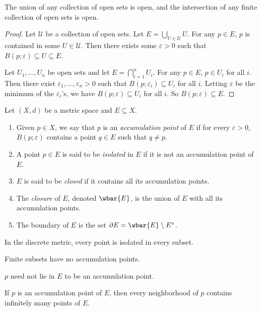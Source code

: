 \begin{proposition} \label{thm:open_union}
    The union of any collection of open sets is open, and the intersection
    of any finite collection of open sets is open.
\end{proposition}
\begin{proof}
    Let $\mathscr{U}$ be a collection of open sets.
    Let $E = \bigcup_{U \in \mathscr{U}} U$.
    For any $p \in E$, $p$ is contained in some $U \in \mathscr{U}$.
    Then there exists some $\varepsilon > 0$ such that $B(p; \varepsilon)
    \subseteq U \subseteq E$.

    Let $U_1, \dots, U_n$ be open sets and let $E = \bigcap_{i=1}^n U_i$.
    For any $p \in E$, $p \in U_i$ for all $i$.
    Then there exist $\varepsilon_1, \dots, \varepsilon_n > 0$ such that
    $B(p; \varepsilon_i) \subseteq U_i$ for all $i$.
    Letting $\varepsilon$ be the minimum of the $\varepsilon_i$'s, we have
    $B(p; \varepsilon) \subseteq U_i$ for all $i$.
    So $B(p; \varepsilon) \subseteq E$.
\end{proof}

\begin{definition*}
    Let $(X, d)$ be a metric space and $E \subseteq X$.
    \begin{enumerate}
        \item Given $p \in X$, we say that $p$ is an \emph{accumulation
        point} of $E$ if for every $\varepsilon > 0$, $B(p; \varepsilon)$
        contains a point $q \in E$ such that $q \ne p$.
        \item A point $p \in E$ is said to be \emph{isolated} in $E$ if it
        is not an accumulation point of $E$.
        \item $E$ is said to be \emph{closed} if it contains all its
        accumulation points.
        \item The \emph{closure} of $E$, denoted $\wbar{E}$, is the union
        of $E$ with all its accumulation points.
        \item The boundary of $E$ is the set
        $\partial E = \wbar{E} \setminus E^\circ$.
    \end{enumerate}
\end{definition*}

\begin{examples}
    \item In the discrete metric, every point is isolated in every subset.
    \item Finite subsets have no accumulation points.
\end{examples}

\begin{remarks}
    \item $p$ need not lie in $E$ to be an accumulation point.
    \item If $p$ is an accumulation point of $E$, then every neighborhood of
    $p$ contains infinitely many points of $E$.
\end{remarks}

